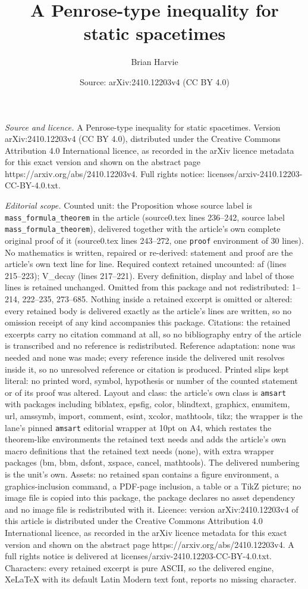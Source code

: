 \documentclass[10pt,a4paper]{amsart}
\title[A Penrose-type inequality for static spacetimes]{A Penrose-type inequality for static spacetimes}
\author{Brian Harvie}
\date{Source: arXiv:2410.12203v4 (CC BY 4.0)}
\begin{document}
\maketitle

\noindent\emph{Source and licence.} A Penrose-type inequality for static spacetimes. Version arXiv:2410.12203v4 (CC BY 4.0), distributed under the Creative Commons Attribution 4.0 International licence, as recorded in the arXiv licence metadata for this exact version and shown on the abstract page https://arxiv.org/abs/2410.12203v4. Full rights notice: licenses/arxiv-2410.12203-CC-BY-4.0.txt.\par\smallskip

\noindent\textit{Editorial scope.} Counted unit: the Proposition whose source label is \texttt{mass\_formula\_theorem} in the article (source0.tex lines 236--242, source label \texttt{mass\_formula\_theorem}), delivered together with the article's own complete original proof of it (source0.tex lines 243--272, one \texttt{proof} environment of 30 lines). No mathematics is written, repaired or re-derived: statement and proof are the article's own text line for line. Required context retained uncounted: af (lines 215--223); V\_decay (lines 217--221). Every definition, display and label of those lines is retained unchanged. Omitted from this package and not redistributed: 1--214, 222--235, 273--685. Nothing inside a retained excerpt is omitted or altered: every retained body is delivered exactly as the article's lines are written, so no omission receipt of any kind accompanies this package. Citations: the retained excerpts carry no citation command at all, so no bibliography entry of the article is transcribed and no reference is redistributed. Reference adaptation: none was needed and none was made; every reference inside the delivered unit resolves inside it, so no unresolved reference or citation is produced. Printed slips kept literal: no printed word, symbol, hypothesis or number of the counted statement or of its proof was altered. Layout and class: the article's own class is \texttt{amsart} with packages including biblatex, epsfig, color, blindtext, graphicx, enumitem, url, amssymb, import, comment, esint, xcolor, mathtools, tikz; the wrapper is the lane's pinned \texttt{amsart} editorial wrapper at 10pt on A4, which restates the theorem-like environments the retained text needs and adds the article's own macro definitions that the retained text needs (none), with extra wrapper packages (bm, bbm, dsfont, xspace, cancel, mathtools). The delivered numbering is the unit's own. Assets: no retained span contains a figure environment, a graphics-inclusion command, a PDF-page inclusion, a table or a TikZ picture; no image file is copied into this package, the package declares no asset dependency and no image file is redistributed with it. Licence: version arXiv:2410.12203v4 of this article is distributed under the Creative Commons Attribution 4.0 International licence, as recorded in the arXiv licence metadata for this exact version and shown on the abstract page https://arxiv.org/abs/2410.12203v4. A full rights notice is delivered at licenses/arxiv-2410.12203-CC-BY-4.0.txt. Characters: every retained excerpt is pure ASCII, so the delivered engine, XeLaTeX with its default Latin Modern text font, reports no missing character.
\end{document}

